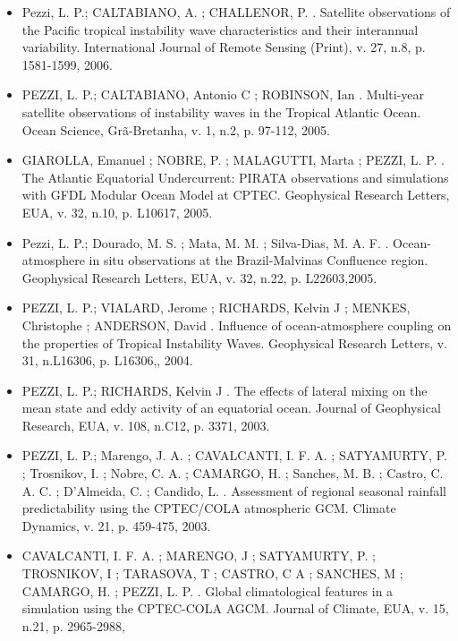 \documentclass[11pt, a4paper]{awesome-cv}
\begin{document}
\begin{cvletter}
\begin{itemize}
  \item[] Pezzi, L. P.; CALTABIANO, A. ; CHALLENOR, P. . Satellite observations of the Pacific tropical 
  instability wave characteristics and their interannual variability. International Journal of 
  Remote Sensing (Print), v. 27, n.8, p. 1581-1599,
  2006.

  \item[] PEZZI, L. P.; CALTABIANO, Antonio C ; ROBINSON, Ian . Multi-year satellite observations of 
  instability waves in the Tropical Atlantic Ocean. Ocean Science, Grã-Bretanha, v. 1, n.2, p. 
  97-112, 2005.

  \item[] GIAROLLA, Emanuel ; NOBRE, P. ; MALAGUTTI, Marta ; PEZZI, L. P. . The Atlantic Equatorial 
  Undercurrent: PIRATA observations and simulations with GFDL Modular Ocean Model at CPTEC. 
  Geophysical Research Letters, EUA, v. 32, n.10, p. L10617, 2005.

  \item[] Pezzi, L. P.; Dourado, M. S. ; Mata, M. M. ; Silva-Dias, M. A. F. . Ocean-atmosphere in situ 
  observations at the Brazil-Malvinas Confluence region. Geophysical Research Letters, EUA, v. 32, 
  n.22, p. L22603,2005.

  \item[] PEZZI, L. P.; VIALARD, Jerome ; RICHARDS, Kelvin J ; MENKES, Christophe ; ANDERSON, David . 
  Influence of ocean-atmosphere coupling on the properties of Tropical Instability Waves. 
  Geophysical Research Letters, v. 31, n.L16306, p. L16306,, 2004.

  \item[] PEZZI, L. P.; RICHARDS, Kelvin J . The effects of lateral mixing on the mean state and eddy 
  activity of an equatorial ocean. Journal of Geophysical Research, EUA, v. 108, n.C12, p. 3371, 2003.

  \item[] PEZZI, L. P.; Marengo, J. A. ; CAVALCANTI, I. F. A. ; SATYAMURTY, P. ; Trosnikov, I. ; 
  Nobre, C. A. ; CAMARGO, H. ; Sanches, M. B. ; Castro, C. A. C. ; D'Almeida, C. ; Candido, L. . 
  Assessment of regional seasonal rainfall predictability using the CPTEC/COLA atmospheric GCM. 
  Climate Dynamics, v. 21, p. 459-475,
  2003.

  \item[] 	CAVALCANTI, I. F. A. ; MARENGO, J ; SATYAMURTY, P. ; TROSNIKOV, I ; TARASOVA, T ; CASTRO, 
  C A ; SANCHES, M ; CAMARGO, H. ; PEZZI, L. P. . Global climatological features in a simulation 
  using the CPTEC-COLA AGCM. Journal of Climate, EUA, v. 15, n.21, p. 2965-2988,


\end{itemize}
\end{cvletter}
\end{document}

